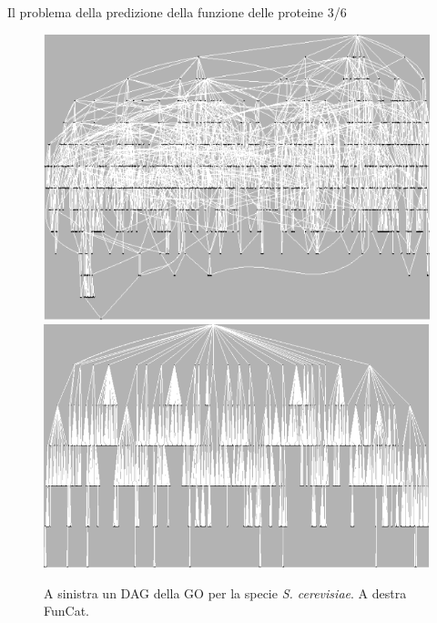 \documentclass{beamer}
\begin{document}
\begin{tframe}{\small Il problema della predizione della funzione delle proteine  3/6}
\begin{figure}[h]
\center
\includegraphics[scale=0.25]{./img/GO.png}
\includegraphics[scale=0.24]{./img/FunCat.png}
\caption{\footnotesize{A sinistra un DAG della GO per la specie \emph{S. cerevisiae}. A destra FunCat.}}
\label{DAGTREE}
\end{figure}
\end{tframe}
\end{document}
